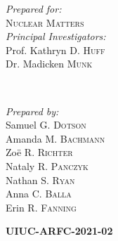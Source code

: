 \begin{titlepage}
       \begin{minipage}{0.45\textwidth}
               \begin{flushleft}
                       \large
                       \textit{Prepared for:}\\
                       \textsc{Nuclear Matters}%
                       \vspace{4mm}\\ %
                       \textit{Principal Investigators:}\\ %
                       Prof. Kathryn D. \textsc{Huff}\\ %
                       Dr. Madicken \textsc{Munk} %
                \end{flushleft}
       \end{minipage}
       ~
       \begin{minipage}{0.45\textwidth}
               \begin{flushright}
                       \large
                       \textit{Prepared by:}\\
                       Samuel G. \textsc{Dotson}\\ %
                       Amanda M. \textsc{Bachmann}\\ %
                       Zo\"{e} R. \textsc{Richter}\\ %
                       Nataly R. \textsc{Panczyk}\\ %
                       Nathan S. \textsc{Ryan}\\ %
                       Anna C. \textsc{Balla}\\ %
                       Erin R. \textsc{Fanning}
               \end{flushright}
    \end{minipage}


    \vspace{.5cm}
    \textsc{\LARGE\bfseries UIUC-ARFC-2021-02} %
    \vspace{0.2cm}


\end{titlepage}
